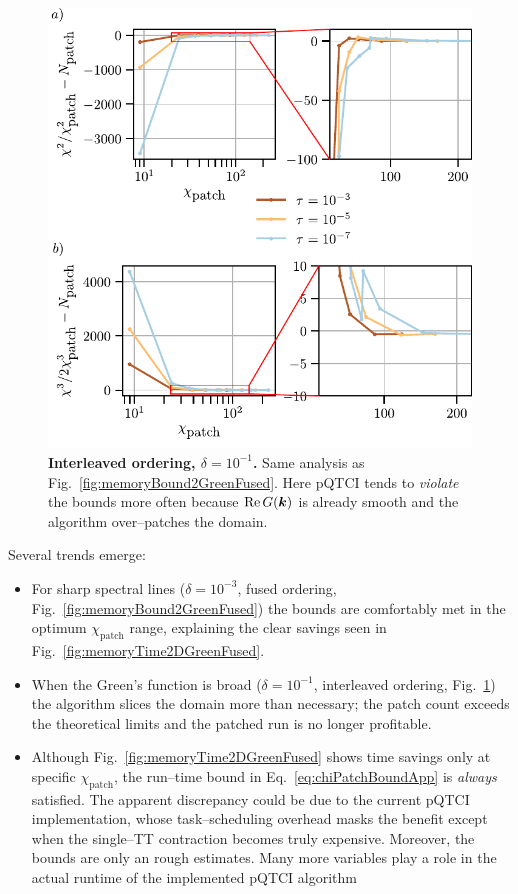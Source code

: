 \begin{figure}[htpb]
    \centering
    \includegraphics{figures/2DGreenMemoryTimeMemoryBoundInterleaved.pdf}
    \caption{\textbf{Interleaved ordering, \(\delta=10^{-1}\).}
    Same analysis as Fig.~\ref{fig:memoryBound2GreenFused}.
    Here pQTCI tends to \emph{violate} the bounds more often because \(\operatorname{Re}G(\boldsymbol{k})\) is already smooth and the algorithm over–patches the domain.}
    \label{fig:memoryBound2GreenInterleaved}
\end{figure}

Several trends emerge:

\begin{itemize}
  \item For sharp spectral lines (\(\delta=10^{-3}\), fused ordering,
        Fig.~\ref{fig:memoryBound2GreenFused}) the bounds are comfortably
        met in the optimum \(\chi_{\text{patch}}\) range, explaining the
        clear savings seen in Fig.~\ref{fig:memoryTime2DGreenFused}.
  \item When the Green’s function is broad (\(\delta=10^{-1}\), interleaved
        ordering, Fig.~\ref{fig:memoryBound2GreenInterleaved}) the algorithm
        slices the domain more than necessary; the patch count exceeds the
        theoretical limits and the patched run is no longer profitable.
  \item Although Fig.~\ref{fig:memoryTime2DGreenFused} shows time savings
        only at specific \(\chi_{\text{patch}}\), the run–time bound in
        Eq.~\eqref{eq:chiPatchBoundApp} is \emph{always} satisfied.  The
        apparent discrepancy could be due to the current pQTCI implementation, whose task–scheduling overhead masks the benefit except when the single–TT contraction becomes truly expensive. Moreover, the bounds are only an rough estimates. Many more variables play a role in the actual runtime of the implemented pQTCI algorithm
\end{itemize}

